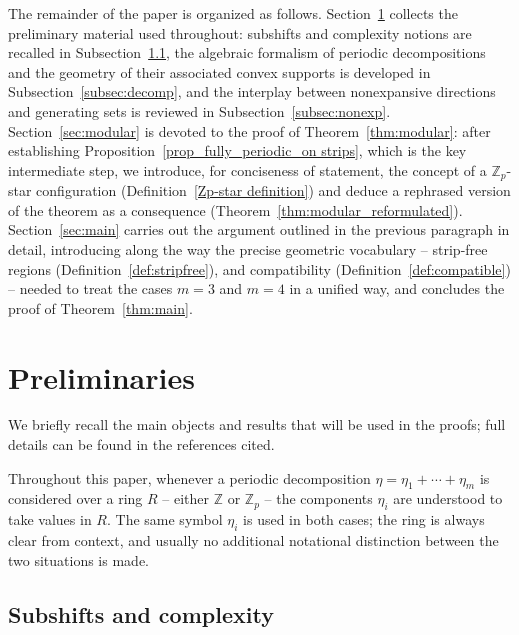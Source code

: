 \documentclass[12pt]{amsart}
\numberwithin{equation}{section}
\begin{document}
The remainder of the paper is organized as follows.
Section~\ref{sec:prelim} collects the preliminary material used
throughout: subshifts and complexity notions are recalled in
Subsection~\ref{subsec:subshifts}, the algebraic formalism of periodic
decompositions and the geometry of their associated convex supports is
developed in Subsection~\ref{subsec:decomp}, and the interplay between
nonexpansive directions and generating sets is reviewed in
Subsection~\ref{subsec:nonexp}.
Section~\ref{sec:modular} is devoted to the proof of
Theorem~\ref{thm:modular}: after establishing
Proposition~\ref{prop_fully_periodic_on strips}, which is the key
intermediate step, we introduce, for conciseness of statement, the
concept of a $\mathbb{Z}_p$-star configuration
(Definition~\ref{Zp-star definition}) and deduce a rephrased version of the
theorem as a consequence (Theorem~\ref{thm:modular_reformulated}).
Section~\ref{sec:main} carries out the argument outlined in the previous paragraph in detail, introducing along the way the precise geometric vocabulary -- strip-free regions (Definition~\ref{def:stripfree}), and compatibility (Definition~\ref{def:compatible}) -- needed to treat the cases $m=3$ and $m=4$ in a unified way, and concludes the proof of Theorem~\ref{thm:main}.

\section{Preliminaries}
\label{sec:prelim}

We briefly recall the main objects and results that will be used in
the proofs; full details can be found in the references cited.

Throughout this paper, whenever a periodic decomposition
$\eta=\eta_1+\cdots+\eta_m$ is considered over a ring $R$ -- either
$\mathbb{Z}$ or $\mathbb{Z}_p$ -- the components $\eta_i$ are
understood to take values in $R$. The same symbol $\eta_i$ is used
in both cases; the ring is always clear from context, and usually no
additional notational distinction between the two situations is made.

\subsection{Subshifts and complexity}\label{subsec:subshifts}
\end{document}
